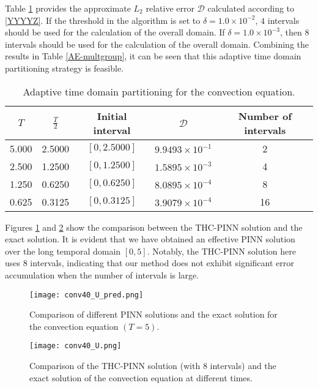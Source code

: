 \documentclass[preprint]{elsarticle}
\numberwithin{table}{section}
\numberwithin{equation}{section}
\numberwithin{figure}{section}
\begin{document}
\begin{CJK}{UTF8}{gbsn}
  Table \ref{adpTTTT} provides the approximate $L_2$
  relative error $\mathcal{D}$ calculated according to  \eqref{YYYYZ}. If the threshold in the algorithm is set to $\delta=1.0\times10^{-2}$,   $4$ intervals should be used for  the calculation of the overall domain. If $\delta=1.0\times10^{-3}$, then $8$ intervals should be used for the calculation of the overall domain. Combining the results in Table \ref{AE-multgroup}, it can be seen that this adaptive time domain partitioning strategy is feasible.
\begin{table}[htbp]
    \centering
    \begin{tabular}{ccccc}
        \hline
  $T$ & $\frac{T}{2}$ & Initial interval & $\mathcal{D}$ &Number of intervals\\ 
        \hline
5.000 & 2.5000& $[0,2.5000]$ &$9.9493 \times 10^{-1} $&2\\
2.500&1.2500 & $[0,1.2500]$ & $1.5895 \times 10^{-3} $&4 \\
1.250&0.6250& $[0,0.6250]$& $8.0895 \times 10^{-4}$&8 \\
0.625&0.3125 & $[0,0.3125]$ & $3.9079 \times 10^{-4} $ &16\\
        \hline
    \end{tabular}
    \caption{Adaptive time domain partitioning for the convection equation.}
    \label{adpTTTT}
\end{table}




Figures \ref{conv40_c1} and \ref{conv40_c2} show the comparison between the THC-PINN solution and the exact solution. It is evident that we have obtained an effective PINN solution over the long temporal domain  $[0,5]$. Notably, the THC-PINN solution here uses $8$ intervals, indicating that our method does not exhibit significant error accumulation when the number of intervals is large.
\begin{figure}[htbp]
\centering
\texttt{[image: conv40\_U\_pred.png]}
\caption{Comparison of different PINN solutions and the exact solution for the convection equation $(T=5)$.}
\label{conv40_c1}
\end{figure}
\begin{figure}[htbp]
\centering
\texttt{[image: conv40\_U.png]}
\caption{Comparison of the THC-PINN solution (with $8$ intervals) and the exact solution of the convection equation at different times.}
\label{conv40_c2}
\end{figure}





\end{CJK}
\end{document}
